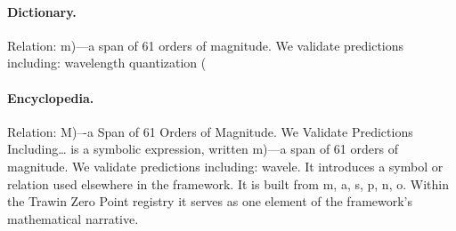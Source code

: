 \paragraph{Dictionary.}
Relation: m)---a span of 61 orders of magnitude. We validate predictions including: wavelength quantization (

\paragraph{Encyclopedia.}
Relation: M)–-a Span of 61 Orders of Magnitude. We Validate Predictions Including… is a symbolic expression, written m)---a span of 61 orders of magnitude. We validate predictions including: wavele. It introduces a symbol or relation used elsewhere in the framework. It is built from m, a, s, p, n, o. Within the Trawin Zero Point registry it serves as one element of the framework's mathematical narrative.
